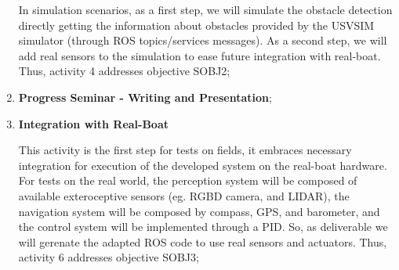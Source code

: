 \begin{enumerate}
            In simulation scenarios, as a first step, we will simulate the obstacle detection directly getting the information about obstacles provided by the USVSIM simulator (through \ac{ROS} topics/services messages). As a second step, we will add real sensors to the simulation to ease future integration with real-boat. Thus, activity 4 addresses objective SOBJ2; 
            
            \item \textbf{Progress Seminar - Writing and Presentation};
            
            \item \textbf{Integration with Real-Boat}
            
            This activity is the first step for tests on fields, it embraces necessary integration for execution of the developed system on the real-boat hardware. For tests on the real world, the perception system will be composed of available exteroceptive sensors (eg. \ac{RGBD} camera, and \ac{LIDAR}), the navigation system will be composed by compass, \ac{GPS}, and barometer, and the control system will be implemented through a \ac{PID}. So, as deliverable we will gerenate the adapted \ac{ROS} code to use real sensors and actuators. Thus, activity 6 addresses objective SOBJ3;
            

\end{enumerate}
